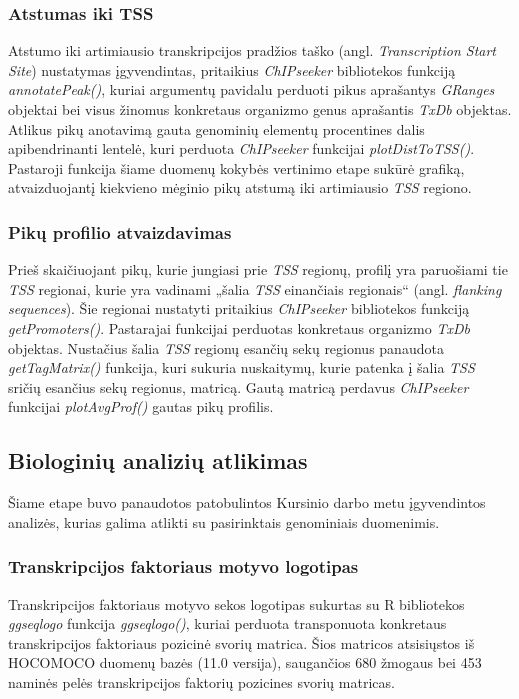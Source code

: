 \documentclass[12pt]{article}
\begin{document}
\subsubsection*{Atstumas iki TSS}
Atstumo iki artimiausio transkripcijos pradžios taško
(angl. \emph{Transcription Start Site}) nustatymas įgyvendintas, pritaikius
\emph{ChIPseeker} bibliotekos funkciją \emph{annotatePeak()}, kuriai argumentų
pavidalu perduoti pikus aprašantys \emph{GRanges}\cite{GRANGES} objektai bei
visus žinomus konkretaus organizmo genus aprašantis \emph{TxDb}\cite{TXDB_MM}
objektas. Atlikus pikų anotavimą gauta genominių elementų procentines dalis
apibendrinanti lentelė, kuri perduota \emph{ChIPseeker} funkcijai
\emph{plotDistToTSS()}. Pastaroji funkcija šiame duomenų kokybės vertinimo
etape sukūrė grafiką, atvaizduojantį kiekvieno mėginio pikų atstumą iki
artimiausio \emph{TSS} regiono.

\subsubsection*{Pikų profilio atvaizdavimas}
Prieš skaičiuojant pikų, kurie jungiasi prie \emph{TSS} regionų, profilį yra
paruošiami tie \emph{TSS} regionai, kurie yra vadinami „šalia \emph{TSS}
einančiais regionais“ (angl. \emph{flanking sequences}). Šie regionai nustatyti
pritaikius \emph{ChIPseeker} bibliotekos funkciją \emph{getPromoters()}.
Pastarajai funkcijai perduotas konkretaus organizmo \emph{TxDb} objektas.
Nustačius šalia \emph{TSS} regionų esančių sekų regionus panaudota
\emph{getTagMatrix()} funkcija, kuri sukuria nuskaitymų, kurie patenka į šalia
\emph{TSS} sričių esančius sekų regionus, matricą. Gautą matricą perdavus
\emph{ChIPseeker} funkcijai \emph{plotAvgProf()} gautas pikų profilis.

\newpage

\subsection{Biologinių analizių atlikimas}
Šiame etape buvo panaudotos patobulintos Kursinio darbo metu įgyvendintos
analizės, kurias galima atlikti su pasirinktais genominiais duomenimis.

\subsubsection*{Transkripcijos faktoriaus motyvo logotipas}
Transkripcijos faktoriaus motyvo sekos logotipas sukurtas su R bibliotekos
\emph{ggseqlogo}\cite{GGSEQLOGO} funkcija \emph{ggseqlogo()}, kuriai perduota
transponuota konkretaus transkripcijos faktoriaus pozicinė svorių matrica.
Šios matricos atsisiųstos iš HOCOMOCO\cite{HOCOMOCO} duomenų bazės (11.0
versija), saugančios 680 žmogaus bei 453 naminės pelės transkripcijos faktorių
pozicines svorių matricas.
\end{document}
